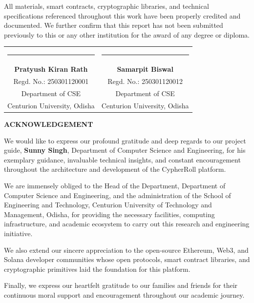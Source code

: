 All materials, smart contracts, cryptographic libraries, and technical specifications referenced throughout this work have been properly credited and documented. We further confirm that this report has not been submitted previously to this or any other institution for the award of any degree or diploma.

\vspace{5.0cm}
\noindent
\begin{tabular*}{\textwidth}{@{\extracolsep{\fill}}cc}
    \rule{5.8cm}{0.4pt} & \rule{5.8cm}{0.4pt} \\
    \textbf{Pratyush Kiran Rath} & \textbf{Samarpit Biswal} \\
    Regd. No.: 250301120001 & Regd. No.: 250301120012 \\
    Department of CSE & Department of CSE \\
    Centurion University, Odisha & Centurion University, Odisha
\end{tabular*}

\newpage
\pagestyle{frontmatterstyle}
\thispagestyle{frontmatterstyle}
\begin{center}
    \vspace*{0.5cm}
    {\Large \textbf{ACKNOWLEDGEMENT}\par}
    \vspace{1.0cm}
\end{center}

We would like to express our profound gratitude and deep regards to our project guide, \textbf{Sunny Singh}, Department of Computer Science and Engineering, for his exemplary guidance, invaluable technical insights, and constant encouragement throughout the architecture and development of the CypherRoll platform.

We are immensely obliged to the Head of the Department, Department of Computer Science and Engineering, and the administration of the School of Engineering and Technology, Centurion University of Technology and Management, Odisha, for providing the necessary facilities, computing infrastructure, and academic ecosystem to carry out this research and engineering initiative.

We also extend our sincere appreciation to the open-source Ethereum, Web3, and Solana developer communities whose open protocols, smart contract libraries, and cryptographic primitives laid the foundation for this platform.

Finally, we express our heartfelt gratitude to our families and friends for their continuous moral support and encouragement throughout our academic journey.

